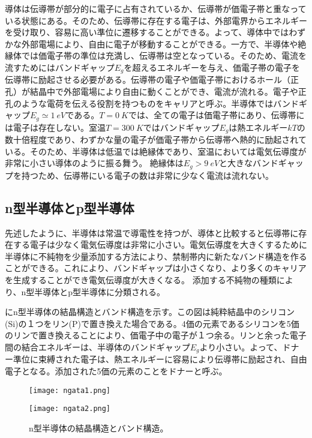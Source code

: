 導体は伝導帯が部分的に電子に占有されているか、伝導帯が価電子帯と重なっている状態にある。そのため、伝導帯に存在する電子は、外部電界からエネルギーを受け取り、容易に高い準位に遷移することができる。よって、導体中ではわずかな外部電場により、自由に電子が移動することができる。一方で、半導体や絶縁体では価電子帯の準位は充満し、伝導帯は空となっている。そのため、電流を流すためにはバンドギャップ$E_g$を超えるエネルギーを与え、価電子帯の電子を伝導帯に励起させる必要がある。伝導帯の電子や価電子帯におけるホール（正孔）が結晶中で外部電場により自由に動くことができ、電流が流れる。電子や正孔のような電荷を伝える役割を持つものをキャリアと呼ぶ。半導体ではバンドギャップ$E_g\simeq 1\ \si{eV}$である。$T=0\ \si{K}$では、全ての電子は価電子帯にあり、伝導帯には電子は存在しない。室温$T=300\ \si{K}$ではバンドギャップ$E_g$は熱エネルギー$kT$の数十倍程度であり、わずかな量の電子が価電子帯から伝導帯へ熱的に励起されている。そのため、半導体は低温では絶縁体であり、室温においては電気伝導度が非常に小さい導体のように振る舞う。
絶縁体は$E_g>9\ \si{eV}$と大きなバンドギャップを持つため、伝導帯にいる電子の数は非常に少なく電流は流れない。

\subsection{n型半導体とp型半導体}
\label{sec:pngata}
先述したように、半導体は常温で導電性を持つが、導体と比較すると伝導帯に存在する電子は少なく電気伝導度は非常に小さい。電気伝導度を大きくするために半導体に不純物を少量添加する方法により、禁制帯内に新たなバンド構造を作ることができる。これにより、バンドギャップは小さくなり、より多くのキャリアを生成することができ電気伝導度が大きくなる。
添加する不純物の種類により、n型半導体とp型半導体に分類される。

にn型半導体の結晶構造とバンド構造を示す。この図は純粋結晶中のシリコン(Si)の１つをリン(P)で置き換えた場合である。4価の元素であるシリコンを5価のリンで置き換えることにより、価電子中の電子が１つ余る。リンと余った電子間の結合エネルギーは、半導体のバンドギャップ$E_g$より小さい。よって、ドナー準位に束縛された電子は、熱エネルギーに容易により伝導帯に励起され、自由電子となる。添加された5価の元素のことをドナーと呼ぶ。
\begin{figure}[tbp]
  \begin{minipage}[b]{0.5\linewidth}
    \centering
    \texttt{[image: ngata1.png]}
  \end{minipage}
  \begin{minipage}[b]{0.5\linewidth}
    \centering
    \texttt{[image: ngata2.png]}
  \end{minipage}
  \caption[n型半導体の結晶構造とバンド構造]{n型半導体の結晶構造とバンド構造。}
  \label{fig:ngata}
\end{figure}

